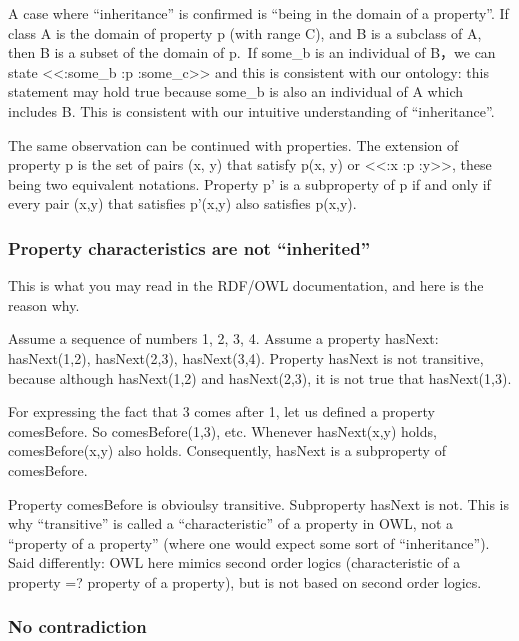 \documentclass[
  11pt,
]{article}
\begin{document}
A case where ``inheritance'' is confirmed is ``being in the domain of a
property''. If class A is the domain of property p (with range C), and B
is a subclass of A, then B is a subset of the domain of p.~If some\_b is
an individual of B，we can state \textless\textless:some\_b :p
:some\_c\textgreater\textgreater{} and this is consistent with our
ontology: this statement may hold true because some\_b is also an
individual of A which includes B. This is consistent with our intuitive
understanding of ``inheritance''.

The same observation can be continued with properties. The extension of
property p is the set of pairs (x, y) that satisfy p(x, y) or
\textless\textless:x :p :y\textgreater\textgreater, these being two
equivalent notations. Property p' is a subproperty of p if and only if
every pair (x,y) that satisfies p'(x,y) also satisfies p(x,y).

\hypertarget{property-characteristics-are-not-inherited}{%
\subsubsection{Property characteristics are not
``inherited''}\label{property-characteristics-are-not-inherited}}

This is what you may read in the RDF/OWL documentation, and here is the
reason why.

Assume a sequence of numbers 1, 2, 3, 4. Assume a property hasNext:
hasNext(1,2), hasNext(2,3), hasNext(3,4). Property hasNext is not
transitive, because although hasNext(1,2) and hasNext(2,3), it is not
true that hasNext(1,3).

For expressing the fact that 3 comes after 1, let us defined a property
comesBefore. So comesBefore(1,3), etc. Whenever hasNext(x,y) holds,
comesBefore(x,y) also holds. Consequently, hasNext is a subproperty of
comesBefore.

Property comesBefore is obvioulsy transitive. Subproperty hasNext is
not. This is why ``transitive'' is called a ``characteristic'' of a
property in OWL, not a ``property of a property'' (where one would
expect some sort of ``inheritance''). Said differently: OWL here mimics
second order logics (characteristic of a property =? property of a
property), but is not based on second order logics.

\hypertarget{no-contradiction}{%
\subsubsection{No contradiction}\label{no-contradiction}}
\end{document}
